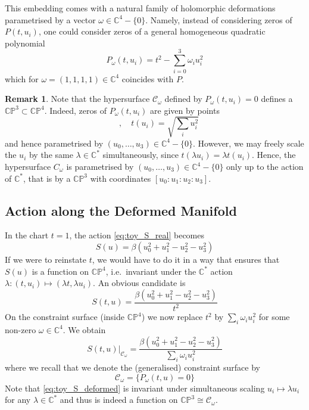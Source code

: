 \documentclass[a4paper,11pt]{article}
\theoremstyle{definition}
\newtheorem{remark}{Remark}
\newcommand{\CC}{\mathbb{C}}
\newcommand{\CP}{\mathbb{CP}}
\begin{document}
This embedding comes with a natural family of holomorphic deformations parametrised by a vector $\omega \in \CC^4 - \{ 0 \}$.
Namely, instead of considering zeros of $P(t,u_i)$, one could consider zeros of a general homogeneous quadratic polynomial 
\begin{equation}
  P_{\omega}(t,u_i) = t^2 - \sum_{i=0}^3 \omega_i u_i^2
\end{equation}
which for $\omega = (1,1,1,1) \in \CC^4$ coincides with $P$.

\begin{remark}
  Note that the hypersurface $\mathcal C_{\omega}$ defined by $P_{\omega}(t,u_i) = 0$ defines a $\CP^3 \subset \CP^4$. 
  Indeed, zeros of $P_{\omega}(t,u_i)$ are given by points 
  \begin{equation}
    [t(u_i):u_0:u_1:u_2:u_3] \quad , \quad t(u_i) = \sqrt{\sum_{i} u_i^2}
  \end{equation}
  and hence parametrised by $(u_0, \dots, u_3) \in \CC^4 - \{ 0 \}$.
  However, we may freely scale the $u_i$ by the same $\lambda \in \CC^*$ simultaneously, since $t(\lambda u_i) = \lambda t(u_i)$.
  Hence, the hypersurface $C_{\omega}$ is parametrised by $(u_0,\dots,u_3) \in \CC^4 - \{ 0 \}$ only up to the action of $\CC^*$, that is by a $\CP^3$ with coordinates $[u_0:u_1:u_2:u_3]$.
\end{remark}

\subsection{Action along the Deformed Manifold}
In the chart $t=1$, the action \eqref{eq:toy_S_real} becomes 
\begin{equation}
  S(u) = \beta \left( u_0^2 + u_1^2 - u_2^2 - u_3^2 \right)
\end{equation}
If we were to reinstate $t$, we would have to do it in a way that ensures that $S(u)$ is a function on $\CP^4$, i.e.\ invariant under the $\CC^*$ action $\lambda \colon (t,u_i) \mapsto (\lambda t, \lambda u_i)$.
An obvious candidate is 
\begin{equation}
  S(t,u) = \frac{\beta\left( u_0^2 + u_1^2 - u_2^2 - u_3^2 \right)}{t^2}
\end{equation}
On the constraint surface (inside $\CP^4$) we now replace $t^2$ by $\sum_i \omega_i u_i^2$ for some non-zero $\omega \in \CC^4$.
We obtain 
\begin{equation}
  S(t,u)\rvert_{\mathcal C_{\omega}} = \frac{\beta\left( u_0^2 + u_1^2 - u_2^2 - u_3^2 \right)}{\sum_i \omega_i u_i^2}
  \label{eq:toy_S_deformed}
\end{equation}
where we recall that we denote the (generalised) constraint surface by 
\begin{equation}
  \mathcal C_{\omega} = \{ P_{\omega}(t,u) = 0 \}
\end{equation}
Note that \eqref{eq:toy_S_deformed} is invariant under simultaneous scaling $u_i \mapsto \lambda u_i$ for any $\lambda \in \CC^*$ and thus is indeed a function on $\CP^3 \cong \mathcal C_{\omega}$.
\end{document}
